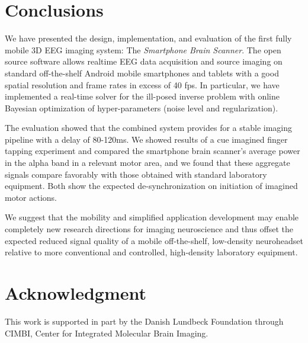 \documentclass[10pt]{article}
\begin{document}
 \section{Conclusions}

We have presented the design, implementation, and evaluation of the first fully mobile 3D EEG imaging system: The \emph{Smartphone Brain Scanner}. The open source software allows realtime EEG data acquisition and source imaging on standard off-the-shelf Android mobile smartphones and tablets with a good spatial resolution and frame rates in excess of 40 fps. In particular, we have implemented a real-time solver for the ill-posed inverse problem with online Bayesian optimization of hyper-parameters (noise level and regularization).

The evaluation showed that the combined system provides for a stable imaging pipeline with a delay of 80-120ms. We showed results of a cue imagined finger tapping experiment and compared the smartphone brain scanner's average power in the alpha band in a relevant motor area, and we found that these aggregate signals compare favorably with those obtained with standard laboratory equipment. Both show the expected de-synchronization on initiation of imagined motor actions.

We suggest that the mobility and simplified application development may enable completely new research directions for imaging neuroscience and thus offset the expected reduced signal quality of a mobile off-the-shelf, low-density neuroheadset relative to more conventional and controlled, high-density laboratory equipment.
 \section*{Acknowledgment}
This work is supported in part by the Danish Lundbeck Foundation through CIMBI, Center for Integrated Molecular Brain Imaging.  


\end{document}
